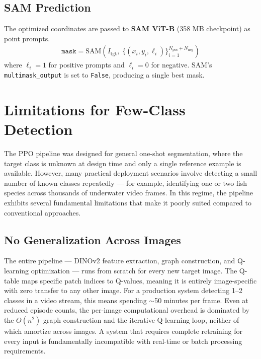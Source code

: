\documentclass[11pt]{article}
\begin{document}
\subsection{SAM Prediction}

The optimized coordinates are passed to \textbf{SAM ViT-B} (358 MB checkpoint) as point prompts.
\begin{align}
\texttt{mask} = \text{SAM}\!\left(I_{\text{tgt}}, \; \{(x_i, y_i, \ell_i)\}_{i=1}^{N_{\text{pos}} + N_{\text{neg}}}\right)
\end{align}
where $\ell_i = 1$ for positive prompts and $\ell_i = 0$ for negative. SAM's \texttt{multimask\_output} is set to \texttt{False}, producing a single best mask.

\newpage

\section{Limitations for Few-Class Detection}
\label{sec:limitations}

The PPO pipeline was designed for general one-shot segmentation, where the target class is unknown at design time and only a single reference example is available. However, many practical deployment scenarios involve detecting a small number of known classes repeatedly --- for example, identifying one or two fish species across thousands of underwater video frames. In this regime, the pipeline exhibits several fundamental limitations that make it poorly suited compared to conventional approaches.

\subsection{No Generalization Across Images}

The entire pipeline --- DINOv2 feature extraction, graph construction, and Q-learning optimization --- runs from scratch for every new target image. The Q-table maps specific patch indices to Q-values, meaning it is entirely image-specific with zero transfer to any other image. For a production system detecting 1--2 classes in a video stream, this means spending $\sim$50 minutes per frame. Even at reduced episode counts, the per-image computational overhead is dominated by the $O(n^2)$ graph construction and the iterative Q-learning loop, neither of which amortize across images. A system that requires complete retraining for every input is fundamentally incompatible with real-time or batch processing requirements.
\end{document}
